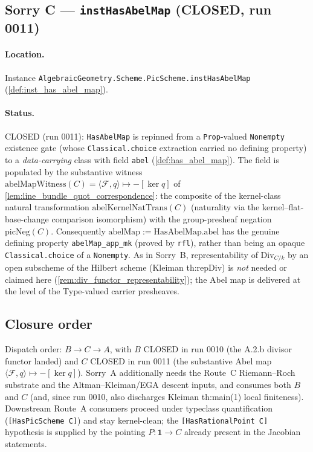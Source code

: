\subsection{Sorry C --- \texttt{instHasAbelMap} (CLOSED, run 0011)}
\label{subsec:sorry_has_abel_map}

\paragraph{Location.} Instance
\texttt{AlgebraicGeometry.Scheme.PicScheme.instHasAbelMap}
(\cref{def:inst_has_abel_map}).

\paragraph{Status.} CLOSED (run 0011): \texttt{HasAbelMap} is repinned
from a \texttt{Prop}-valued \texttt{Nonempty} existence gate (whose
\texttt{Classical.choice} extraction carried no defining property) to a
\emph{data-carrying} class with field \texttt{abel}
(\cref{def:has_abel_map}). The field is populated by the substantive
witness \(\mathrm{abelMapWitness}(C) = \langle \mathcal F, q\rangle
\mapsto -[\ker q]\) of \cref{lem:line_bundle_quot_correspondence}: the
composite of the kernel-class natural transformation
\(\mathrm{abelKernelNatTrans}(C)\) (naturality via the kernel--flat-base-change
comparison isomorphism) with the group-presheaf negation
\(\mathrm{picNeg}(C)\). Consequently \(\mathrm{abelMap} :=
\mathrm{HasAbelMap.abel}\) has the genuine defining property
\texttt{abelMap\_app\_mk} (proved by \texttt{rfl}), rather than being an
opaque \texttt{Classical.choice} of a \texttt{Nonempty}. As in Sorry~B,
representability of \(\mathrm{Div}_{C/k}\) by an open subscheme of the
Hilbert scheme (Kleiman th:repDiv) is \emph{not} needed or claimed here
(\cref{rem:div_functor_representability}); the Abel map is delivered at
the level of the Type-valued carrier presheaves.

\subsection{Closure order}
\label{subsec:fga_pic_closure_order_summary}

Dispatch order: \(B \to C \to A\), with \(B\) CLOSED in run 0010 (the
A.2.b divisor functor landed) and \(C\) CLOSED in run 0011 (the
substantive Abel map \(\langle \mathcal F, q\rangle \mapsto
-[\ker q]\)). Sorry~A additionally needs the Route~C Riemann--Roch
substrate and the Altman--Kleiman/EGA descent inputs, and consumes both
\(B\) and \(C\) (and, since run 0010, also discharges Kleiman th:main(1)
local finiteness). Downstream Route~A consumers proceed under typeclass
quantification (\texttt{[HasPicScheme C]}) and stay kernel-clean; the
\texttt{[HasRationalPoint C]} hypothesis is supplied by the pointing
\(P : \mathbf 1 \to C\) already present in the Jacobian statements.

